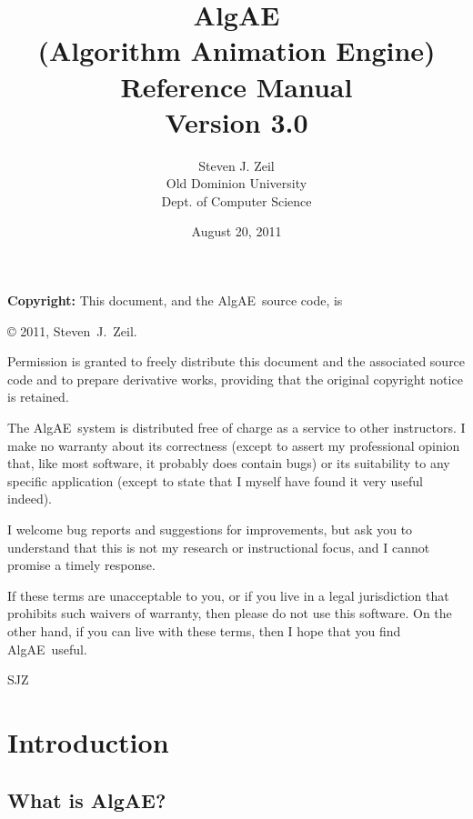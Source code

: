 \documentclass[11pt,titlepage]{book}
\newcommand{\algae}{{\sc AlgAE}}
\begin{document}
\title{AlgAE \\ (Algorithm Animation Engine) \\ Reference
Manual\\Version 3.0}
\author{Steven J. Zeil \\
Old Dominion University \\ Dept. of Computer
Science}
\date{August 20, 2011}

\maketitle


{\bf Copyright:}
This document, and the \algae\ source code, is\\
\begin{center}
\copyright{} 2011, Steven~J.~Zeil.
\end{center}

Permission is granted to freely distribute this document and the
associated source code and to prepare derivative works, providing that
the original copyright notice is retained.

The \algae\ system is distributed free of charge as a service to other
instructors. I make no warranty about its correctness (except to
assert my professional opinion that, like most software, it probably
does contain bugs) or its suitability to any specific application
(except to state that I myself have found it very useful indeed).

I welcome bug reports and suggestions for improvements, but ask you to
understand that this is not my research or instructional focus, and I
cannot promise a timely response.

If these terms are unacceptable to you, or if you live in a legal
jurisdiction that prohibits such waivers of warranty, then please do
not use this software.  On the other hand, if you can live with these
terms, then I hope that you find \algae\ useful.

\noindent
SJZ
\vfill
\newpage

\tableofcontents

\newpage
\chapter{Introduction}
\section{What is AlgAE?}
\end{document}
